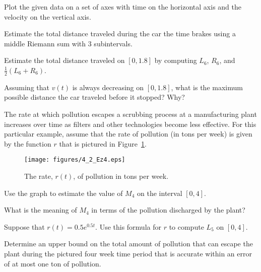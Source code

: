 \begin{exercises}
\begin{center}
\end{center}
\ba
	\item Plot the given data on a set of axes with time on the horizontal axis and the velocity on the vertical axis.
	\item Estimate the total distance traveled during the car the time brakes using a middle Riemann sum with 3 subintervals.
	\item Estimate the total distance traveled on $[0,1.8]$ by computing $L_6$, $R_6$, and $\frac{1}{2}(L_6 + R_6)$.
	\item Assuming that $v(t)$ is always decreasing on $[0,1.8]$, what is the maximum possible distance the car traveled before it stopped?  Why?
\ea
	\item The rate at which pollution escapes a scrubbing process at a manufacturing plant increases over time as filters and other technologies become less effective.  For this particular example, assume that the rate of pollution (in tons per week) is given by the function $r$ that is pictured in Figure~\ref{F:4.2.Ez4}.
\begin{figure}[h]
\begin{center}
\texttt{[image: figures/4\_2\_Ez4.eps]}
\caption{The rate, $r(t)$, of pollution in tons per week.} \label{F:4.2.Ez4}
\end{center}
\end{figure} 
	\ba
		\item Use the graph to estimate the value of $M_4$ on the interval $[0,4]$.
		\item What is the meaning of $M_4$ in terms of the pollution discharged by the plant?
		\item Suppose that $r(t) = 0.5 e^{0.5t}$.  Use this formula for $r$ to compute $L_5$ on $[0,4]$.  
		\item Determine an upper bound on the total amount of pollution that can escape the plant during the pictured four week time period that is accurate within an error of at most one ton of pollution.
	\ea
\end{exercises}
\afterexercises
